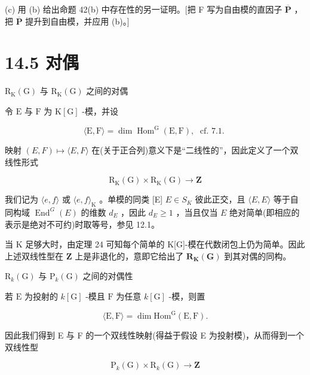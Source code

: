 \documentclass[10pt]{article}
\begin{document}
(c) 用 (b) 给出命题 42(b) 中存在性的另一证明。[把 F 写为自由模的直因子 \(\overline{\mathbf{P}}\) ，把 \(\overline{\mathbf{P}}\) 提升到自由模，并应用 (b)。]

\section*{14.5 对偶}

\({\mathrm{R}}_{\mathrm{K}}\left( \mathrm{G}\right)\) 与 \({\mathrm{R}}_{\mathrm{K}}\left( \mathrm{G}\right)\) 之间的对偶

令 \(\mathrm{E}\) 与 \(\mathrm{F}\) 为 \(\mathrm{K}\left\lbrack  \mathrm{G}\right\rbrack\) -模，并设

\[
\langle \mathrm{E},\mathrm{F}\rangle  = \dim {\operatorname{Hom}}^{\mathrm{G}}\left( {\mathrm{E},\mathrm{F}}\right) ,\;\text{ cf. 7.1. }
\]

映射 \(\left( {E,F}\right)  \mapsto  \langle E,F\rangle\) 在(关于正合列)意义下是“二线性的”，因此定义了一个双线性形式

\[
{\mathrm{R}}_{\mathrm{K}}\left( \mathrm{G}\right)  \times  {\mathrm{R}}_{\mathrm{K}}\left( \mathrm{G}\right)  \rightarrow  \mathbf{Z}
\]

我们记为 \(\langle e,f\rangle\) 或 \(\langle e,f{\rangle }_{\mathrm{K}}\) 。单模的同类 [E] \(E \in  {S}_{K}\) 彼此正交，且 \(\langle E,E\rangle\) 等于自同构域 \({\operatorname{End}}^{G}\left( E\right)\) 的维数 \({d}_{E}\) ，因此 \({d}_{E} \geq  1\) ，当且仅当 \(E\) 绝对简单(即相应的表示是绝对不可约)时取等号，参见 12.1。

当 K 足够大时，由定理 24 可知每个简单的 K[G]-模在代数闭包上仍为简单。因此上述双线性型在 \(\mathbf{Z}\) 上是非退化的，意即它给出了 \({\mathbf{R}}_{\mathbf{K}}\left( \mathbf{G}\right)\) 到其对偶的同构。

\({\mathrm{R}}_{k}\left( \mathrm{G}\right)\) 与 \({\mathrm{P}}_{k}\left( \mathrm{G}\right)\) 之间的对偶性

若 \(\mathrm{E}\) 为投射的 \(k\left\lbrack  \mathrm{G}\right\rbrack\) -模且 \(\mathrm{F}\) 为任意 \(k\left\lbrack  \mathrm{G}\right\rbrack\) -模，则置

\[
\langle \mathrm{E},\mathrm{F}\rangle  = \dim {\mathrm{{Hom}}}^{\mathrm{G}}\left( {\mathrm{E},\mathrm{F}}\right) .
\]

因此我们得到 E 与 F 的一个双线性映射(得益于假设 E 为投射模)，从而得到一个双线性型

\[
{\mathrm{P}}_{k}\left( \mathrm{G}\right)  \times  {\mathrm{R}}_{k}\left( \mathrm{G}\right)  \rightarrow  \mathbf{Z}
\]
\end{document}
